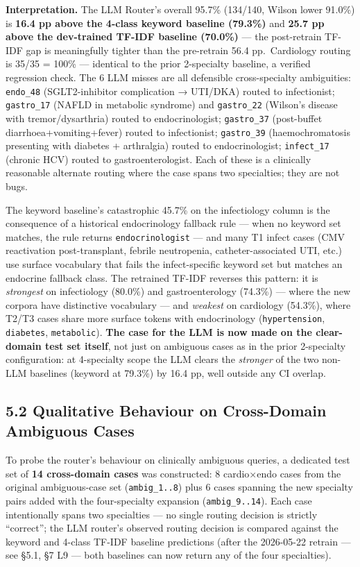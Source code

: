 \documentclass[
  american,
  a4paper,
]{article}
\begin{document}
\textbf{Interpretation.} The LLM Router's overall 95.7\% (134/140,
Wilson lower 91.0\%) is \textbf{16.4 pp above the 4-class keyword
baseline (79.3\%)} and \textbf{25.7 pp above the dev-trained TF-IDF
baseline (70.0\%)} --- the post-retrain TF-IDF gap is meaningfully
tighter than the pre-retrain 56.4 pp.~Cardiology routing is 35/35 =
100\% --- identical to the prior 2-specialty baseline, a verified
regression check. The 6 LLM misses are all defensible cross-specialty
ambiguities: \texttt{endo\_48} (SGLT2-inhibitor complication → UTI/DKA)
routed to infectionist; \texttt{gastro\_17} (NAFLD in metabolic
syndrome) and \texttt{gastro\_22} (Wilson's disease with
tremor/dysarthria) routed to endocrinologist; \texttt{gastro\_37}
(post-buffet diarrhoea+vomiting+fever) routed to infectionist;
\texttt{gastro\_39} (haemochromatosis presenting with diabetes +
arthralgia) routed to endocrinologist; \texttt{infect\_17} (chronic HCV)
routed to gastroenterologist. Each of these is a clinically reasonable
alternate routing where the case spans two specialties; they are not
bugs.

The keyword baseline's catastrophic 45.7\% on the infectiology column is
the consequence of a historical endocrinology fallback rule --- when no
keyword set matches, the rule returns \texttt{endocrinologist} --- and
many T1 infect cases (CMV reactivation post-transplant, febrile
neutropenia, catheter-associated UTI, etc.) use surface vocabulary that
fails the infect-specific keyword set but matches an endocrine fallback
class. The retrained TF-IDF reverses this pattern: it is
\emph{strongest} on infectiology (80.0\%) and gastroenterology (74.3\%)
--- where the new corpora have distinctive vocabulary --- and
\emph{weakest} on cardiology (54.3\%), where T2/T3 cases share more
surface tokens with endocrinology (\texttt{hypertension},
\texttt{diabetes}, \texttt{metabolic}). \textbf{The case for the LLM is
now made on the clear-domain test set itself}, not just on ambiguous
cases as in the prior 2-specialty configuration: at 4-specialty scope
the LLM clears the \emph{stronger} of the two non-LLM baselines (keyword
at 79.3\%) by 16.4 pp, well outside any CI overlap.

\subsection{5.2 Qualitative Behaviour on Cross-Domain Ambiguous
Cases}\label{qualitative-behaviour-on-cross-domain-ambiguous-cases}

To probe the router's behaviour on clinically ambiguous queries, a
dedicated test set of \textbf{14 cross-domain cases} was constructed: 8
cardio×endo cases from the original ambiguous-case set
(\texttt{ambig\_1..8}) plus 6 cases spanning the new specialty pairs
added with the four-specialty expansion (\texttt{ambig\_9..14}). Each
case intentionally spans two specialties --- no single routing decision
is strictly ``correct''; the LLM router's observed routing decision is
compared against the keyword and 4-class TF-IDF baseline predictions
(after the 2026-05-22 retrain --- see §5.1, §7 L9 --- both baselines can
now return any of the four specialties).
\end{document}
